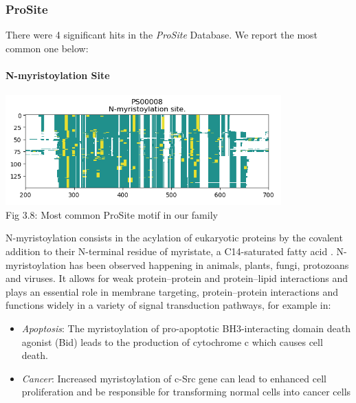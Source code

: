 \documentclass[10pt,twocolumn,letterpaper]{article}
\begin{document}
\subsubsection{ProSite}

There were 4 significant hits in the \textit{ProSite} Database. We report the most common one below:

\paragraph{N-myristoylation Site}

\begin{center}
    \includegraphics[scale=1]{report/img/prosite.png} \\
    \small{Fig 3.8: Most common ProSite motif in our family}
\end{center}

N-myristoylation consists in the acylation of eukaryotic proteins by the covalent addition to their N-terminal residue of myristate, a C14-saturated fatty acid \cite{N-myristoylation}.
N-myristoylation has been observed happening in animals, plants, fungi, protozoans and viruses. It allows for weak protein–protein and protein–lipid interactions and plays an essential role in membrane targeting, protein–protein interactions and functions widely in a variety of signal transduction pathways, for example in:
\begin{itemize}
    \item \textit{Apoptosis}: The myristoylation of pro-apoptotic BH3-interacting domain death agonist (Bid) leads to the production of cytochrome c which causes cell death.

    \item \textit{Cancer}: Increased myristoylation of c-Src gene can lead to enhanced cell proliferation and be responsible for transforming normal cells into cancer cells
\end{itemize} \\
\end{document}
